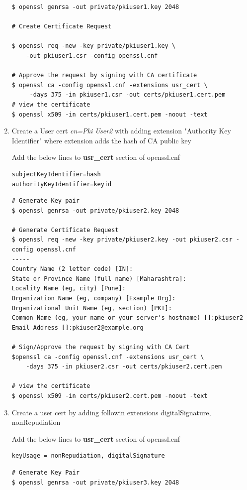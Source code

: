 \documentclass[a4paper]{article}
\begin{document}
\begin{enumerate}[label*=\arabic*.]
\begin{lstlisting}[style=BashInputStyle]
$ openssl genrsa -out private/pkiuser1.key 2048
        
# Create Certificate Request

$ openssl req -new -key private/pkiuser1.key \
    -out pkiuser1.csr -config openssl.cnf

# Approve the request by signing with CA certificate
$ openssl ca -config openssl.cnf -extensions usr_cert \
     -days 375 -in pkiuser1.csr -out certs/pkiuser1.cert.pem
# view the certificate
$ openssl x509 -in certs/pkiuser1.cert.pem -noout -text
        \end{lstlisting}
    \item Create a User cert \textit{cn=Pki User2} with adding extension "Authority Key Identifier" where 
        extension adds the hash of CA public key

        Add the below lines to \textbf{usr\_cert} section of openssl.cnf
        \begin{lstlisting}
subjectKeyIdentifier=hash
authorityKeyIdentifier=keyid
        \end{lstlisting}
        \begin{lstlisting}[style=bashInputStyle]
# Generate Key pair
$ openssl genrsa -out private/pkiuser2.key 2048

# Generate Certificate Request 
$ openssl req -new -key private/pkiuser2.key -out pkiuser2.csr -config openssl.cnf
-----
Country Name (2 letter code) [IN]:
State or Province Name (full name) [Maharashtra]:
Locality Name (eg, city) [Pune]:
Organization Name (eg, company) [Example Org]:
Organizational Unit Name (eg, section) [PKI]:
Common Name (eg, your name or your server's hostname) []:pkiuser2
Email Address []:pkiuser2@example.org

# Sign/Approve the request by signing with CA Cert
$openssl ca -config openssl.cnf -extensions usr_cert \
    -days 375 -in pkiuser2.csr -out certs/pkiuser2.cert.pem

# view the certificate
$ openssl x509 -in certs/pkiuser2.cert.pem -noout -text
        \end{lstlisting}
    \item Create a user cert by adding followin extensions digitalSignature, nonRepudiation

        Add the below lines to \textbf{usr\_cert} section of openssl.cnf
        \begin{lstlisting}
keyUsage = nonRepudiation, digitalSignature
        \end{lstlisting}
        \begin{lstlisting}[style=bashInputStyle]
# Generate Key Pair
$ openssl genrsa -out private/pkiuser3.key 2048        


\end{lstlisting}
\end{enumerate}
\end{document}
